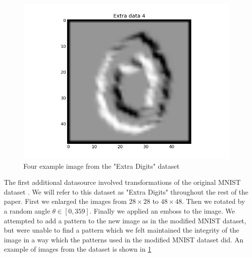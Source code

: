 \documentclass[conference]{IEEEtran}
\begin{document}
\begin{figure}[h]
	\includegraphics[scale=0.20]{Extradata4.png}
	\caption{Four example image from the "Extra Digits" dataset}
	\label{ExtraData}
\end{figure}

The first additional datasource involved transformations of the original MNIST dataset \cite{MNIST_Original}. We will refer to this dataset as "Extra Digits" throughout the rest of the paper. First we enlarged the images from $28\times 28$ to $48\times 48$. Then we rotated by a random angle $\theta \in  [0,359]$. Finally we applied an emboss to the image. We attempted to add a pattern to the new image as in the modified MNIST dataset, but were unable to find a pattern which we felt maintained the integrity of the image in a way which the patterns used in the modified MNIST dataset did. An example of images from the dataset is shown in \ref{ExtraData}
\end{document}
